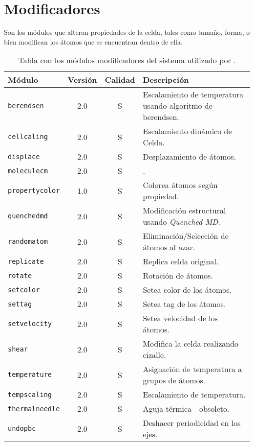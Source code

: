 \section{Modificadores}
Son los m\'odulos que alteran propiedades de la celda, tales como tama\~no, forma, o bien modifican los \'atomos que se encuentran dentro de ella.
\begin{table}[h!]
 \begin{tabular}{|l|c|c|p{10cm}|}\hline
 M\'odulo & Versi\'on & Calidad & Descripci\'on \\
 \hline\hline
 \texttt{berendsen} & 2.0 & S & Escalamiento de temperatura usando algoritmo de berendsen.\\
 \hline
 \texttt{cellcaling} & 2.0 & S & Escalamiento din\'amico de Celda.\\
 \hline
 \texttt{displace} & 2.0 & S & Desplazamiento de \'atomos.\\
 \hline
 \texttt{moleculecm} & 2.0 & S & .\\
 \hline
 \texttt{propertycolor} & 1.0 & S & Colorea \'atomos seg\'un propiedad.\\
 \hline
 \texttt{quenchedmd} & 2.0 & S & Modificaci\'on estructural usando \textit{Quenched MD}.\\
 \hline
 \texttt{randomatom} & 2.0 & S & Eliminaci\'on/Selecci\'on de \'atomos al azar.\\
 \hline
 \texttt{replicate} & 2.0 & S & Replica celda original.\\
 \hline
 \texttt{rotate} & 2.0 & S & Rotaci\'on de \'atomos.\\
 \hline
 \texttt{setcolor} & 2.0 & S & Setea color de los \'atomos.\\
 \hline
 \texttt{settag} & 2.0 & S & Setea tag de los \'atomos.\\
 \hline
 \texttt{setvelocity} & 2.0 & S & Setea velocidad de los \'atomos.\\
 \hline
 \texttt{shear} & 2.0 & S & Modifica la celda realizando cizalle.\\
 \hline
 \texttt{temperature} & 2.0 & S & Asignaci\'on de temperatura a grupos de \'atomos.\\
 \hline
 \texttt{tempscaling} & 2.0 & S & Escalamiento de temperatura.\\
 \hline
 \texttt{thermalneedle} & 2.0 & S & Aguja t\'ermica - obsoleto.\\
 \hline
 \texttt{undopbc} & 2.0 & S & Deshacer periodicidad en los ejes.\\
 \hline
 \end{tabular}
\label{tab:modmodify}
\caption{Tabla con los m\'odulos modificadores del sistema utilizado por {\lpmd}.}
\end{table}

